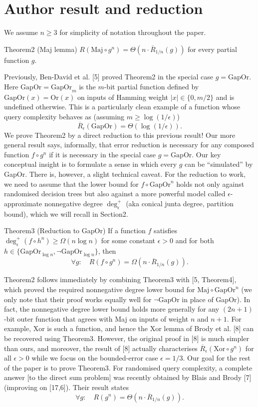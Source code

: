 \section*{Author result and reduction}
We assume $n\ge3$ for simplicity of notation throughout the paper.
\begin{authorclaim}{Theorem2 (Maj lemma)}
$R(\mathrm{Maj}\circ g^n)=\Theta(n\cdot\overline R_{1/n}(g))$ for every partial function $g$.
\end{authorclaim}
Previously, Ben-David et al. [5] proved Theorem2 in the special case $g=\mathrm{GapOr}$. Here $\mathrm{GapOr}=\mathrm{GapOr}_m$ is the $m$-bit partial function defined by $\mathrm{GapOr}(x)=\mathrm{Or}(x)$ on inputs of Hamming weight $|x|\in\{0,m/2\}$ and is undefined otherwise. This is a particularly clean example of a function whose query complexity behaves as (assuming $m\ge\log(1/\epsilon)$)
\[\overline R_\epsilon(\mathrm{GapOr})=\Theta(\log(1/\epsilon)).\]
We prove Theorem2 by a direct reduction to this previous result! Our more general result says, informally, that error reduction is necessary for any composed function $f\circ g^n$ if it is necessary in the special case $g=\mathrm{GapOr}$. Our key conceptual insight is to formulate a sense in which every $g$ can be ``simulated'' by GapOr. There is, however, a slight technical caveat. For the reduction to work, we need to assume that the lower bound for $f\circ\mathrm{GapOr}^n$ holds not only against randomised decision trees but also against a more powerful model called $\epsilon$-approximate nonnegative degree $\deg^+_\epsilon$ (aka conical junta degree, partition bound), which we will recall in Section2.
\begin{authorclaim}{Theorem3 (Reduction to GapOr)}
If a function $f$ satisfies $\deg^+_\epsilon(f\circ h^n)\ge\Omega(n\log n)$ for some constant $\epsilon>0$ and for both $h\in\{\mathrm{GapOr}_{\log n},\neg\mathrm{GapOr}_{\log n}\}$, then
\[\forall g:\quad R(f\circ g^n)=\Omega(n\cdot\overline R_{1/n}(g)).\]
\end{authorclaim}
Theorem2 follows immediately by combining Theorem3 with [5, Theorem4], which proved the required nonnegative degree lower bound for $\mathrm{Maj}\circ\mathrm{GapOr}^n$ (we only note that their proof works equally well for $\neg\mathrm{GapOr}$ in place of GapOr). In fact, the nonnegative degree lower bound holds more generally for any $(2n+1)$-bit outer function that agrees with Maj on inputs of weight $n$ and $n+1$. For example, Xor is such a function, and hence the Xor lemma of Brody et al. [8] can be recovered using Theorem3. However, the original proof in [8] is much simpler than ours, and moreover, the result of [8] actually characterises $\overline R_\epsilon(\mathrm{Xor}\circ g^n)$ for all $\epsilon>0$ while we focus on the bounded-error case $\epsilon=1/3$.
Our goal for the rest of the paper is to prove Theorem3.
For randomised query complexity, a complete answer [to the direct sum problem] was recently obtained by Blais and Brody [7] (improving on [17,6]). Their result states
\[\forall g:\quad R(g^n)=\Theta(n\cdot\overline R_{1/n}(g)).\tag{Direct sum}\]
